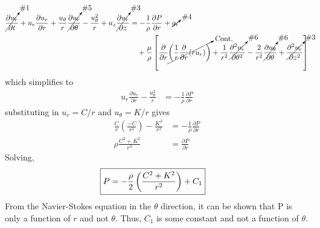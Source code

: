 \begin{align*}
    \cancelto{\text{\#1}}{\frac{\partial u_r}{\partial t}} + u_r \frac{\partial u_r}{\partial r} + \frac{u_{\theta}}{r} \cancelto{\text{\#5}}{\frac{\partial u_r}{\partial \theta}} - \frac{u_{\theta}^2}{r} + u_z \cancelto{\text{\#3}}{\frac{\partial u_r}{\partial z}} &= -\frac{1}{\rho} \frac{\partial P}{\partial r} + \cancelto{\text{\#4}}{g_r} \\
    &\quad + \frac{\mu}{\rho} \left[\frac{\partial}{\partial r}\cancelto{\text{Cont.}}{\left(\frac{1}{r}\frac{\partial}{\partial r}(r u_r)\right)} + \frac{1}{r^2} \cancelto{\text{\#6}}{\frac{\partial^2 u_r}{\partial \theta^2}} - \frac{2}{r^2} \cancelto{\text{\#6}}{\frac{\partial u_{\theta}}{\partial \theta}} + \cancelto{\text{\#3}}{\frac{\partial^2 u_r}{\partial z^2}}\right]
\end{align*}
which simplifies to
\begin{align*}
    u_r \frac{\partial u_r}{\partial r} - \frac{u_{\theta}^2}{r} &= -\frac{1}{\rho} \frac{\partial P}{\partial r}
\end{align*}
substituting in $u_r = C/r$ and $u_{\theta} = K/r$ gives
\begin{align*}
    \frac{C}{r} \left(\frac{-C}{r^2}\right) - \frac{K^2}{r^3} &= -\frac{1}{\rho} \frac{\partial P}{\partial r} \\
    \rho \frac{C^2 + K^2}{r^3} &= \frac{\partial P}{\partial r} 
\end{align*}
Solving,
\begin{align*}
    \Aboxed{P &= -\frac{\rho}{2} \left(\frac{C^2 + K^2}{r^2}\right) + C_1}
\end{align*}
From the Navier-Stokes equation in the $\theta$ direction, it can be shown that P is only a function of $r$ and not $\theta$. Thus, $C_1$ is some constant and not a function of $\theta$.